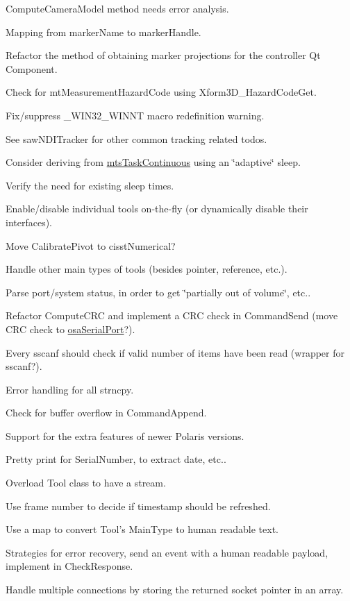 \begin{DoxyRefList}
Compute\-Camera\-Model method needs error analysis. 

Mapping from marker\-Name to marker\-Handle. 

Refactor the method of obtaining marker projections for the controller Qt Component. 

Check for mt\-Measurement\-Hazard\-Code using Xform3\-D\-\_\-\-Hazard\-Code\-Get. 

Fix/suppress \-\_\-\-W\-I\-N32\-\_\-\-W\-I\-N\-N\-T macro redefinition warning. 

See saw\-N\-D\-I\-Tracker for other common tracking related todos.  
\item[\label{todo__todo000018}%
\hypertarget{todo__todo000018}{}%
File \hyperlink{mts_n_d_i_serial_8h}{mts\-N\-D\-I\-Serial.h} ]Consider deriving from \hyperlink{classmts_task_continuous}{mts\-Task\-Continuous} using an \char`\"{}adaptive\char`\"{} sleep. 

Verify the need for existing sleep times. 

Enable/disable individual tools on-\/the-\/fly (or dynamically disable their interfaces). 

Move Calibrate\-Pivot to cisst\-Numerical? 

Handle other main types of tools (besides pointer, reference, etc.). 

Parse port/system status, in order to get \char`\"{}partially out of volume\char`\"{}, etc.. 

Refactor Compute\-C\-R\-C and implement a C\-R\-C check in Command\-Send (move C\-R\-C check to \hyperlink{classosa_serial_port}{osa\-Serial\-Port}?). 

Every sscanf should check if valid number of items have been read (wrapper for sscanf?). 

Error handling for all strncpy. 

Check for buffer overflow in Command\-Append. 

Support for the extra features of newer Polaris versions. 

Pretty print for Serial\-Number, to extract date, etc.. 

Overload Tool class to have a stream. 

Use frame number to decide if timestamp should be refreshed. 

Use a map to convert Tool's Main\-Type to human readable text. 

Strategies for error recovery, send an event with a human readable payload, implement in Check\-Response.  
\item[\label{todo__todo000019}%
\hypertarget{todo__todo000019}{}%
File \hyperlink{mts_open_i_g_t_link_8h}{mts\-Open\-I\-G\-T\-Link.h} ]Handle multiple connections by storing the returned socket pointer in an array. 


\end{DoxyRefList}
